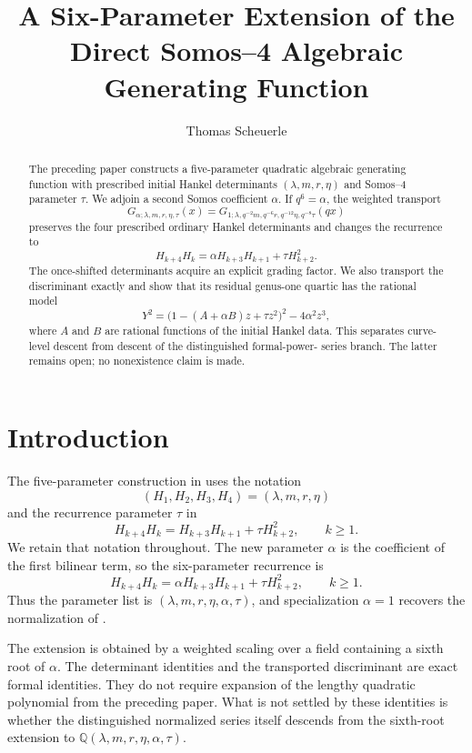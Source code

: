 \documentclass[11pt]{article}
\title{A Six-Parameter Extension of the\\
Direct Somos--4 Algebraic Generating Function}
\author{Thomas Scheuerle}
\date{}
\theoremstyle{definition}
\theoremstyle{remark}
\newcommand{\Q}{\mathbb{Q}}
\begin{document}
\maketitle

\begin{abstract}
The preceding paper constructs a five-parameter quadratic algebraic generating
function with prescribed initial Hankel determinants
$(\lambda,m,r,\eta)$ and Somos--4 parameter $\tau$.  We adjoin a second
Somos coefficient $\alpha$.  If $q^6=\alpha$, the weighted transport
\[
 G_{\alpha;\lambda,m,r,\eta,\tau}(x)
 =G_{1;\lambda,q^{-2}m,q^{-6}r,q^{-12}\eta,q^{-8}\tau}(qx)
\]
preserves the four prescribed ordinary Hankel determinants and changes the
recurrence to
\[
 H_{k+4}H_k=\alpha H_{k+3}H_{k+1}+\tau H_{k+2}^2.
\]
The once-shifted determinants acquire an explicit grading factor.  We also
transport the discriminant exactly and show that its residual genus-one
quartic has the rational model
\[
 Y^2=\bigl(1-(A+\alpha B)z+\tau z^2\bigr)^2-4\alpha^2z^3,
\]
where $A$ and $B$ are rational functions of the initial Hankel data.  This
separates curve-level descent from descent of the distinguished formal-power-
series branch.  The latter remains open; no nonexistence claim is made.
\end{abstract}

\section{Introduction}
The five-parameter construction in \cite{Scheuerle2026} uses the notation
\[
 (H_1,H_2,H_3,H_4)=(\lambda,m,r,\eta)
\]
and the recurrence parameter $\tau$ in
\begin{equation}
 H_{k+4}H_k=H_{k+3}H_{k+1}+\tau H_{k+2}^2,
 \qquad k\geq1.
 \label{eq:old-somos4}
\end{equation}
We retain that notation throughout.  The new parameter $\alpha$ is the
coefficient of the first bilinear term, so the six-parameter recurrence is
\begin{equation}
 H_{k+4}H_k=\alpha H_{k+3}H_{k+1}+\tau H_{k+2}^2,
 \qquad k\geq1.
 \label{eq:new-somos4}
\end{equation}
Thus the parameter list is
$(\lambda,m,r,\eta,\alpha,\tau)$, and specialization $\alpha=1$ recovers the
normalization of \cite{Scheuerle2026}.

The extension is obtained by a weighted scaling over a field containing a
sixth root of $\alpha$.  The determinant identities and the transported
discriminant are exact formal identities.  They do not require expansion of
the lengthy quadratic polynomial from the preceding paper.  What is not
settled by these identities is whether the distinguished normalized series
itself descends from the sixth-root extension to
$\Q(\lambda,m,r,\eta,\alpha,\tau)$.
\end{document}
